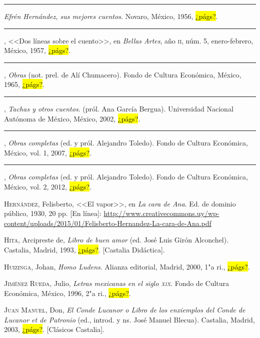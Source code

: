 \documentclass[14pt,twoside,final]{extbook} %
\begin{document}
\rule{1cm}{0.4pt} \emph{Efrén Hernández, sus mejores cuentos}. Novaro, México, 1956, \hl{¿págs?}.\label{bib:hernandez1956}

\rule{1cm}{0.4pt}, <<Dos líneas sobre el cuento>>, en \emph{Bellas Artes}, año \textsc{ii}, núm. 5, enero-febrero, México, 1957, \hl{¿págs?}.\label{bib:hernandez1957}

\rule{1cm}{0.4pt}, \emph{Obras} (not. prel. de Alí Chumacero). Fondo de Cultura Económica, México, 1965, \hl{¿págs?}.\label{bib:hernandez1965}

\rule{1cm}{0.4pt}, \emph{Tachas y otros cuentos}. (pról. Ana García Bergua). Universidad Nacional Autónoma de México, México, 2002, \hl{¿págs?}.\label{bib:hernandez2002}

\rule{1cm}{0.4pt}, \emph{Obras completas} (ed. y pról. Alejandro Toledo). Fondo de Cultura Económica, México, vol. 1, 2007, \hl{¿págs?}.\label{bib:hernandez2007}

\rule{1cm}{0.4pt}, \emph{Obras completas} (ed. y pról. Alejandro Toledo). Fondo de Cultura Económica, México, vol. 2, 2012, \hl{¿págs?}.\label{bib:hernandez2012}

\textsc{Hernández}, Felisberto, <<El vapor>>, en \emph{La cara de Ana}. Ed. de dominio público, 1930, 20 pp. [En línea]: \href{http://www.creativecommons.uy/wp-content/uploads/2015/01/Felisberto-Hernandez-La-cara-de-Ana.pdf}{http://www.creativecommons.uy/wp-content/uploads/2015/01/Felisberto-Hernandez-La-cara-de-Ana.pdf}

\textsc{Hita}, Arcipreste de, \emph{Libro de buen amor} (ed. José Luis Girón Alconchel). Castalia, Madrid, 1993, \hl{¿págs?}. [Castalia Didáctica].\label{bib:hita1993}

\textsc{Huizinga}, Johan, \emph{Homo Ludens}. Alianza editorial, Madrid, 2000, 1"a ri., \hl{¿págs?}.\label{bib:huizinga2000}

\textsc{Jiménez Rueda}, Julio, \emph{Letras mexicanas en el siglo \textsc{xix}}. Fondo de Cultura Económica, México, 1996, 2"a ri., \hl{¿págs?}.\label{bib:jimenez1996}

\textsc{Juan Manuel}, Don, \emph{El Conde Lucanor o Libro de los enxiemplos del Conde de Lucanor et de Patronio} (ed., introd. y ns. José Manuel Blecua). Castalia, Madrid, 2003, \hl{¿págs?}. [Clásicos Castalia].\label{bib:juanmanuel2003}
\end{document}
